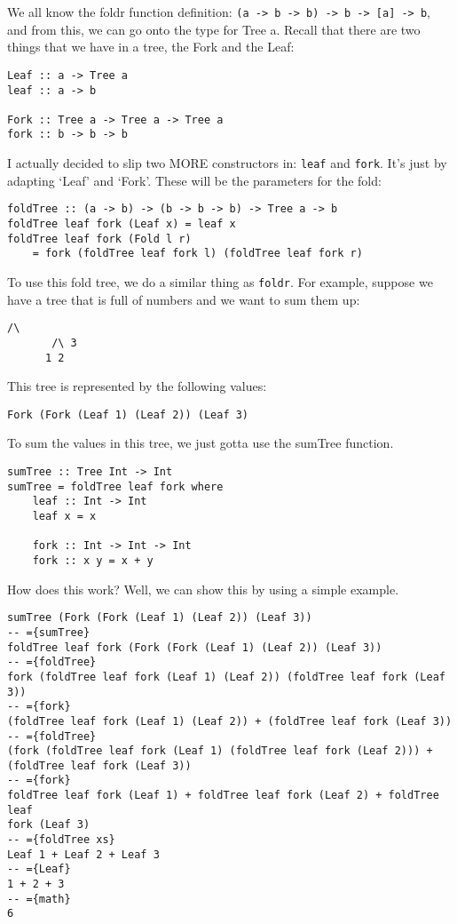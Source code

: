 \documentclass[11pt,a4paper,titlepage,dvipsnames,cmyk]{scrartcl}
\begin{document}
We all know the foldr function definition: 
\lstinline|(a -> b -> b) -> b -> [a] -> b|, and from this, we can go onto
the type for Tree a. Recall that there are two things that we have in a
tree, the Fork and the Leaf:
\begin{lstlisting}[style=B]
Leaf :: a -> Tree a
leaf :: a -> b

Fork :: Tree a -> Tree a -> Tree a
fork :: b -> b -> b
\end{lstlisting}

I actually decided to slip two MORE constructors in: \lstinline|leaf| and
\lstinline|fork|. It's just by adapting `Leaf' and `Fork'. These will be
the parameters for the fold:

\begin{lstlisting}[style=B]
foldTree :: (a -> b) -> (b -> b -> b) -> Tree a -> b
foldTree leaf fork (Leaf x) = leaf x
foldTree leaf fork (Fold l r)
    = fork (foldTree leaf fork l) (foldTree leaf fork r)
\end{lstlisting}

To use this fold tree, we do a similar thing as \lstinline|foldr|. For
example, suppose we have a tree that is full of numbers and we want to sum
them up:
\begin{lstlisting}[style=B]
        /\
       /\ 3
      1 2
\end{lstlisting}
This tree is represented by the following values:
\begin{lstlisting}[style=B]
Fork (Fork (Leaf 1) (Leaf 2)) (Leaf 3)
\end{lstlisting}
To sum the values in this tree, we just gotta use the sumTree function.
\begin{lstlisting}[style=B]
sumTree :: Tree Int -> Int
sumTree = foldTree leaf fork where
    leaf :: Int -> Int
    leaf x = x

    fork :: Int -> Int -> Int
    fork :: x y = x + y
\end{lstlisting}
How does this work? Well, we can show this by using a simple example.
\begin{lstlisting}[style=B]
sumTree (Fork (Fork (Leaf 1) (Leaf 2)) (Leaf 3))
-- ={sumTree}
foldTree leaf fork (Fork (Fork (Leaf 1) (Leaf 2)) (Leaf 3))
-- ={foldTree}
fork (foldTree leaf fork (Leaf 1) (Leaf 2)) (foldTree leaf fork (Leaf 3))
-- ={fork}
(foldTree leaf fork (Leaf 1) (Leaf 2)) + (foldTree leaf fork (Leaf 3))
-- ={foldTree}
(fork (foldTree leaf fork (Leaf 1) (foldTree leaf fork (Leaf 2))) +
(foldTree leaf fork (Leaf 3))
-- ={fork}
foldTree leaf fork (Leaf 1) + foldTree leaf fork (Leaf 2) + foldTree leaf
fork (Leaf 3)
-- ={foldTree xs}
Leaf 1 + Leaf 2 + Leaf 3
-- ={Leaf}
1 + 2 + 3
-- ={math}
6
\end{lstlisting}
\end{document}
